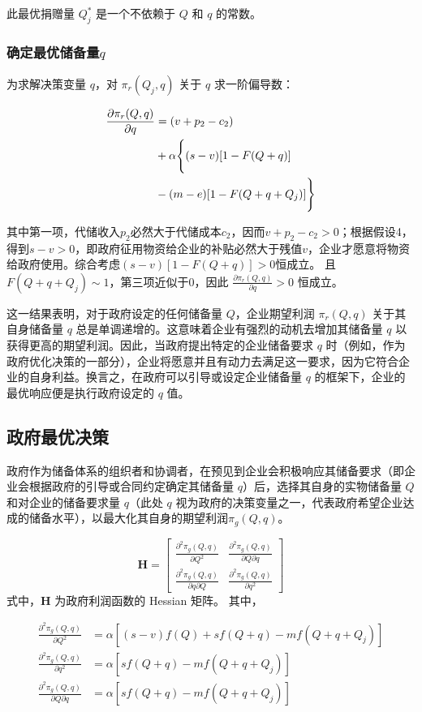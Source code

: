 \documentclass[a4paper,8pt,twocolumn]{article} %
\begin{document}
此最优捐赠量 $Q_j^*$ 是一个不依赖于 $Q$ 和 $q$ 的常数。

\subsubsection{确定最优储备量$q$}
为求解决策变量 $q$，对 $\pi_r(Q_j,q)$ 关于 $q$ 求一阶偏导数：
\begin{small}
    \begin{align} \label{eq:foc_enterprise_interm}
\frac{\partial \pi_r(Q,q)}{\partial q} &=(v+p_2-c_2) \notag \\
&+ \alpha \Biggr\{ (s-v)[1-F(Q+q)] \notag \\
&- (m-e)[1-F(Q+q+Q_j)] \Biggr\}
\end{align}
\end{small}
其中第一项，代储收入$p_2$必然大于代储成本$c_2$，因而$v + p_2 - c_2>0$；根据假设4，得到$s-v>0$，即政府征用物资给企业的补贴必然大于残值$v$，企业才愿意将物资给政府使用。综合考虑$ (s-v)[1-F(Q+q)]>0$恒成立。 且 $F(Q+q+Q_j)\sim1$，第三项近似于0，因此 $\frac{\partial \pi_r(Q,q)}{\partial q} > 0$ 恒成立。

这一结果表明，对于政府设定的任何储备量 $Q$，企业期望利润 $\pi_r(Q,q)$ 关于其自身储备量 $q$ 总是单调递增的。这意味着企业有强烈的动机去增加其储备量 $q$ 以获得更高的期望利润。因此，当政府提出特定的企业储备要求 $q$ 时（例如，作为政府优化决策的一部分），企业将愿意并且有动力去满足这一要求，因为它符合企业的自身利益。换言之，在政府可以引导或设定企业储备量 $q$ 的框架下，企业的最优响应便是执行政府设定的 $q$ 值。

\subsection{政府最优决策}
政府作为储备体系的组织者和协调者，在预见到企业会积极响应其储备要求（即企业会根据政府的引导或合同约定确定其储备量 $q$）后，选择其自身的实物储备量 $Q$ 和对企业的储备要求量 $q$（此处 $q$ 视为政府的决策变量之一，代表政府希望企业达成的储备水平），以最大化其自身的期望利润$\pi_g(Q,q)$。

\begin{equation} \label{eq:hessian}
\boldsymbol{H} = \begin{bmatrix}
\frac{\partial^2 \pi_g(Q,q)}{\partial Q^2} & \frac{\partial^2 \pi_g(Q,q)}{\partial Q\partial q} \\
\frac{\partial^2 \pi_g(Q,q)}{\partial q\partial Q} & \frac{\partial^2 \pi_g(Q,q)}{\partial q^2}
\end{bmatrix}
\end{equation}
式中，$\boldsymbol{H}$ 为政府利润函数的 Hessian 矩阵。
其中，
\begin{small}
    \begin{align*}
\frac{\partial^2 \pi_g(Q,q)}{\partial Q^2} &= \alpha [ (s-v)f(Q) + s f(Q+q) - m f(Q+q+Q_j) ] \\
\frac{\partial^2 \pi_g(Q,q)}{\partial q^2} &=  \alpha [ s f(Q+q) - m f(Q+q+Q_j) ] \\
\frac{\partial^2 \pi_g(Q,q)}{\partial Q\partial q} &=  \alpha [ s f(Q+q) - m f(Q+q+Q_j) ]
\end{align*}
\end{small}
\end{document}
